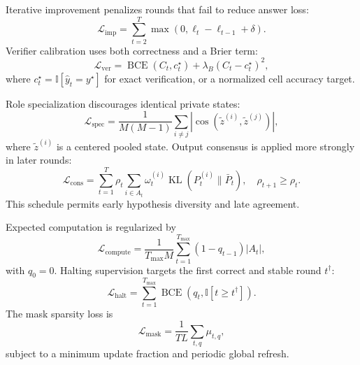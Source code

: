 \documentclass[10pt,a4paper,twocolumn]{article}
\newcommand{\KL}{\operatorname{KL}}
\newcommand{\BCE}{\operatorname{BCE}}
\newcommand{\Ind}{\mathbb{I}}
\begin{document}
Iterative improvement penalizes rounds that fail to reduce answer loss:
\begin{equation}
\mathcal{L}_{\mathrm{imp}}=\sum_{t=2}^{T}\max(0,\ell_t-\ell_{t-1}+\delta). \label{eq:improvement_loss}
\end{equation}
Verifier calibration uses both correctness and a Brier term:
\begin{equation}
\mathcal{L}_{\mathrm{ver}}=\BCE(C_t,c_t^\star)+\lambda_B(C_t-c_t^\star)^2, \label{eq:verifier_loss}
\end{equation}
where $c_t^\star=\Ind[\hat y_t=y^\star]$ for exact verification, or a normalized cell accuracy target.

Role specialization discourages identical private states:
\begin{equation}
\mathcal{L}_{\mathrm{spec}}=\frac{1}{M(M-1)}\sum_{i\ne j}\left|\cos(\widetilde z^{(i)},\widetilde z^{(j)})\right|, \label{eq:specialization_loss}
\end{equation}
where $\widetilde z^{(i)}$ is a centered pooled state. Output consensus is applied more strongly in later rounds:
\begin{equation}
\mathcal{L}_{\mathrm{cons}}=\sum_{t=1}^{T}\rho_t\sum_{i\in A_t}\omega_t^{(i)}\KL(P_t^{(i)}\|\bar P_t), \quad \rho_{t+1}\ge\rho_t. \label{eq:consensus_loss}
\end{equation}
This schedule permits early hypothesis diversity and late agreement.

Expected computation is regularized by
\begin{equation}
\mathcal{L}_{\mathrm{compute}}=\frac{1}{T_{\max}M}\sum_{t=1}^{T_{\max}}(1-q_{t-1})|A_t|, \label{eq:compute_loss}
\end{equation}
with $q_0=0$. Halting supervision targets the first correct and stable round $t^\dagger$:
\begin{equation}
\mathcal{L}_{\mathrm{halt}}=\sum_{t=1}^{T_{\max}}\BCE(q_t,\Ind[t\ge t^\dagger]). \label{eq:halt_loss}
\end{equation}
The mask sparsity loss is
\begin{equation}
\mathcal{L}_{\mathrm{mask}}=\frac{1}{TL}\sum_{t,q}\mu_{t,q}, \label{eq:mask_loss}
\end{equation}
subject to a minimum update fraction and periodic global refresh.
\end{document}
